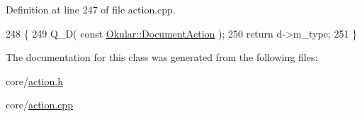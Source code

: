 Definition at line 247 of file action.\+cpp.


\begin{DoxyCode}
248 \{
249     Q\_D( \textcolor{keyword}{const} \hyperlink{classOkular_1_1DocumentAction}{Okular::DocumentAction} );
250     \textcolor{keywordflow}{return} d->m\_type;
251 \}
\end{DoxyCode}


The documentation for this class was generated from the following files\+:\begin{DoxyCompactItemize}
\item 
core/\hyperlink{action_8h}{action.\+h}\item 
core/\hyperlink{action_8cpp}{action.\+cpp}\end{DoxyCompactItemize}
